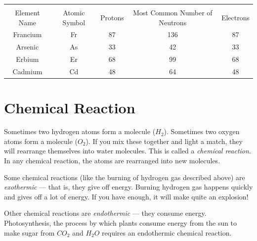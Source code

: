 \begin{Answer}[ref = pne]
\begin{tabular}{|c|c|c|c|c|}
\hline\\
Element Name & Atomic Symbol & Protons & Most Common Number of Neutrons & Electrons\\\hline
 Francium & Fr & 87 & 136 & 87 \\\hline
 Arsenic & As & 33 & 42 & 33 \\\hline
 Erbium & Er & 68 & 99 & 68 \\\hline
 Cadmium & Cd & 48 & 64 & 48 \\\hline
\end{tabular}
\end{Answer}

\section{Chemical Reaction}

Sometimes two hydrogen atoms form a molecule ($H_2$). Sometimes two oxygen
atoms form a molecule ($O_2$). If you mix these together and light a match,
they will rearrange themselves into water molecules. This is called a \textit{
chemical reaction}. In any chemical reaction, the atoms are rearranged into new
molecules.

Some chemical reactions (like the burning of hydrogen gas described above) are
\textit{exothermic} --- that is, they give off energy. Burning hydrogen gas
happens quickly and gives off a lot of energy. If you have enough, it will make
quite an explosion! 

Other chemical reactions are \textit{endothermic} --- they consume energy.
Photosynthesis, the process by which plants consume energy from the sun to make
sugar from $CO_2$ and $H_2O$ requires an endothermic chemical reaction.

